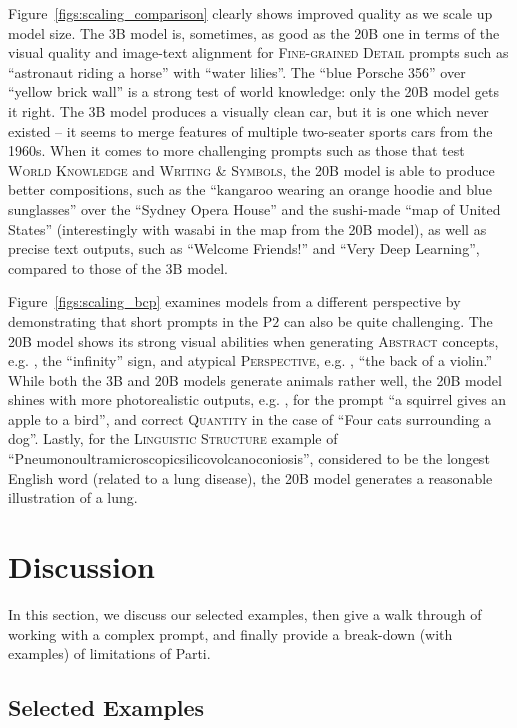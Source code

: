 Figure~\ref{figs:scaling_comparison} clearly shows improved quality as we scale up model size. The 3B model is, sometimes, as good as the 20B one in terms of the visual quality and image-text alignment for \textsc{Fine-grained Detail} prompts such as ``astronaut riding a horse'' with ``water lilies''. The ``blue Porsche 356'' over ``yellow brick wall'' is a strong test of world knowledge: only the 20B model gets it right. The 3B model produces a visually clean car, but it is one which never existed -- it seems to merge features of multiple two-seater sports cars from the 1960s. When it comes to more challenging prompts such as those that test \textsc{World Knowledge} and \textsc{Writing \& Symbols}, the 20B model is able to produce better compositions, such as the ``kangaroo wearing an orange hoodie and blue sunglasses'' over the ``Sydney Opera House'' and the sushi-made ``map of United States'' (interestingly with wasabi in the map from the 20B model), as well as precise text outputs, such as ``Welcome Friends!'' and ``Very Deep Learning'', compared to those of the 3B model.

Figure~\ref{figs:scaling_bcp} examines models from a different perspective by demonstrating that short prompts in the P$2$ can also be quite challenging. The 20B model shows its strong visual abilities when generating \textsc{Abstract} concepts, e.g. , the ``infinity'' sign, and atypical \textsc{Perspective}, e.g. , ``the back of a violin.'' While both the 3B and 20B models generate animals rather well, the 20B model shines with more photorealistic outputs, e.g. , for the prompt ``a squirrel gives an apple to a bird'', and correct \textsc{Quantity} in the case of ``Four cats surrounding a dog''. Lastly, for the \textsc{Linguistic Structure} example of ``Pneumonoultramicroscopicsilicovolcanoconiosis'', considered to be the longest English word (related to a lung disease), the 20B model generates a reasonable illustration of a lung.

\section{Discussion}
\label{sec:discussion}

In this section, we discuss our selected examples, then give a walk through of working with a complex prompt, and finally provide a break-down (with examples) of limitations of Parti.

\subsection{Selected Examples}
\label{sec:selected_discussion}

